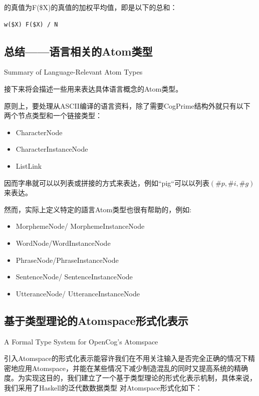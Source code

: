 的真值为F(\$X)的真值的加权平均值，即是以下的总和：

\begin{verbatim}
w($X) F($X) / N
\end{verbatim}

\subsection{总结——语言相关的Atom类型}{Summary of Language-Relevant Atom Types}

接下来将会描述一些用来表达具体语言概念的Atom类型。

原则上，要处理从ASCII编译的语言资料，除了需要CogPrime结构外就只有以下两个节点类型和一个链接类型：

\begin{itemize}
\item CharacterNode
\item CharacterInstanceNode
\item ListLink
\end{itemize}

\noindent 因而字串就可以以列表或拼接的方式来表达，例如“pig“可以以列表$(\#p, \#i, \#g)$来表达。

然而，实际上定义特定的語言Atom类型也很有帮助的，例如:

\begin{itemize}
\item	MorphemeNode/ MorphemeInstanceNode
\item		WordNode/WordInstanceNode
\item		PhraseNode/PhraseInstanceNode
\item		SentenceNode/ SentenceInstanceNode
\item		UtteranceNode/ UtteranceInstanceNode
\end{itemize}





\subsection{基于类型理论的Atomspace形式化表示}{A Formal Type System for OpenCog’s Atomspace}

引入Atomspace的形式化表示能容许我们在不用关注输入是否完全正确的情况下精密地应用Atomspace，并能在某些情况下减少制造混乱的同时又提高系统的精确度。为实现这目的，我们建立了一个基于类型理论的形式化表示机制，具体来说，我们采用了Haskell的泛代数数据类型 \cite{Haskell2014}对Atomspace形式化如下：

